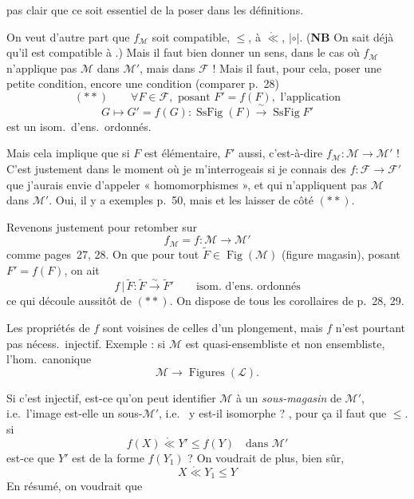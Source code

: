 \documentclass[11pt,a4paper]{article}
\begin{document}
pas clair que ce soit essentiel de la poser dans les définitions.

On veut d'autre part que $f_{\mathcal{M}}$ soit compatible,  $\leq$, à $\mathrel{\mathring{\ll}}$, $|\circ|$. (\textbf{NB} On sait déjà qu'il est compatible à .) Mais il faut bien donner un sens, dans le cas où $f_{\mathcal{M}}$ n'applique pas $\mathcal{M}$ dans $\mathcal{M}'$, mais dans $\mathcal{F}$ ! Mais il faut, pour cela, poser une petite condition, encore une condition (comparer p.~28)
\[
  (**) \qquad \forall F \in \mathcal{F}, \text{ posant } F' = f(F), \text{ l'application}
\]
\[
  G \longmapsto G' = f(G) : \operatorname{SsFig}(F) \xrightarrow{\ \sim\ } \operatorname{SsFig} F'
\]
est un isom.\ d'ens.\ ordonnés.

Mais cela implique que si $F$ est élémentaire, $F'$ aussi, c'est-à-dire $f_{\mathcal{M}} : \mathcal{M} \to \mathcal{M}'$ ! C'est justement dans le moment où je m'interrogeais si je connais des \struck{\ill{}}  $f : \mathcal{F} \to \mathcal{F}'$ que j'aurais envie d'appeler « homomorphismes », et qui n'appliquent pas $\mathcal{M}$ dans $\mathcal{M}'$. Oui, il y a  exemples p.~50, mais \struck{\ill{}}  et \ill{} les laisser de côté $(**)$.

Revenons justement pour retomber sur
\[
  f_{\mathcal{M}} = f : \mathcal{M} \longrightarrow \mathcal{M}'
\]
comme pages~27, 28. On  que pour tout $\widetilde{F} \in \operatorname{Fig}(\mathcal{M})$ (figure  magasin), posant $F' = f(F)$, on ait
\[
  f \,|\, \widetilde{F} : \widetilde{F} \xrightarrow{\ \sim\ } \widetilde{F}' \qquad \text{isom.\ d'ens.\ ordonnés}
\]
ce qui découle aussitôt de $(**)$. On dispose de tous les corollaires de p.~28, 29.

Les propriétés de $f$ sont voisines de celles d'un plongement, mais \struck{\ill{}} $f$ n'est pourtant pas nécess.\ injectif. Exemple : si $\mathcal{M}$ est quasi-ensembliste et non ensembliste, l'hom.\ canonique
\[
  \mathcal{M} \longrightarrow \operatorname{Figures}(\mathcal{L}).
\]

Si c'est injectif, est-ce qu'on peut identifier $\mathcal{M}$ à un \emph{sous-magasin} de $\mathcal{M}'$, i.e.\ l'image  est-elle un sous-$\mathcal{M}'$, i.e.\  y est-il isomorphe \struck{\ill{}}  \ill{} ? \ill{}, pour ça il faut que \ill{} $\leq$.   si
\[
  f(X) \mathrel{\mathring{\ll}} Y' \leq f(Y) \quad \text{dans } \mathcal{M}'
\]
est-ce que $Y'$ est de la forme $f(Y_1)$ ? On voudrait de plus, bien sûr,
\[
  X \mathrel{\mathring{\ll}} Y_1 \leq Y
\]
En résumé, on voudrait que
\end{document}
